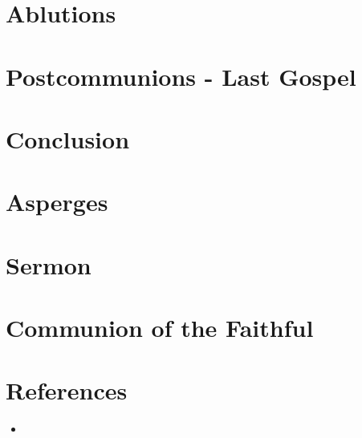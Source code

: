 \documentclass[letterpaper, twocolumn]{article}
\begin{document}
	\section*{Ablutions}
	\section*{Postcommunions - Last Gospel}
	\section*{Conclusion}
	\section*{Asperges}
	\section*{Sermon}
	\section*{Communion of the Faithful}
	\section*{References}
		\begin{itemize}
			\item 
		\end{itemize}
\end{document}

